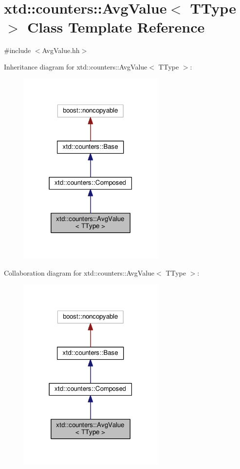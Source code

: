 \hypertarget{classxtd_1_1counters_1_1AvgValue}{}\section{xtd\+:\+:counters\+:\+:Avg\+Value$<$ T\+Type $>$ Class Template Reference}
\label{classxtd_1_1counters_1_1AvgValue}


{\ttfamily \#include $<$Avg\+Value.\+hh$>$}



Inheritance diagram for xtd\+:\+:counters\+:\+:Avg\+Value$<$ T\+Type $>$\+:
\nopagebreak
\begin{figure}[H]
\begin{center}
\leavevmode
\includegraphics[width=207pt]{classxtd_1_1counters_1_1AvgValue__inherit__graph}
\end{center}
\end{figure}


Collaboration diagram for xtd\+:\+:counters\+:\+:Avg\+Value$<$ T\+Type $>$\+:
\nopagebreak
\begin{figure}[H]
\begin{center}
\leavevmode
\includegraphics[width=207pt]{classxtd_1_1counters_1_1AvgValue__coll__graph}
\end{center}
\end{figure}
